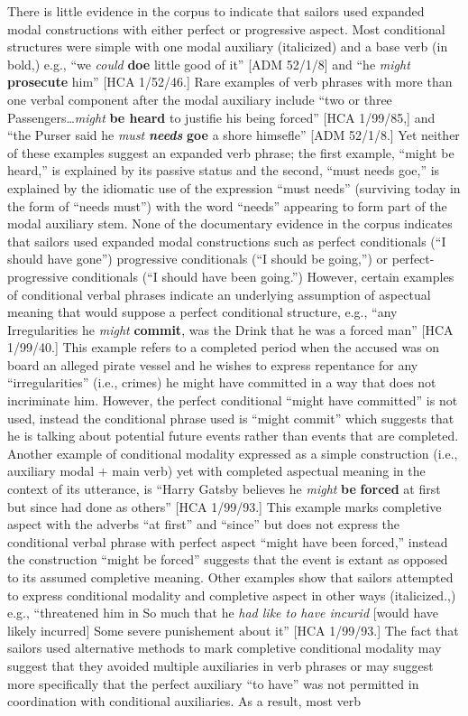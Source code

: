 \documentclass[12pt]{article}
\newenvironment{styleStandard}{\renewcommand\baselinestretch{1.0}\setlength\leftskip{0cm}\setlength\rightskip{0cm plus 1fil}\setlength\parindent{0cm}\setlength\parfillskip{0pt plus 1fil}\setlength\parskip{0in plus 1pt}\writerlistparindent\writerlistleftskip\leavevmode\normalfont\normalsize\writerlistlabel\ignorespaces}{\unskip\vspace{0in plus 1pt}\par}
\newcommand\writerlistleftskip{}
\newcommand\writerlistparindent{}
\newcommand\writerlistlabel{}
\begin{document}
\begin{styleStandard}
There is little evidence in the corpus to indicate that sailors used expanded modal constructions with either perfect or progressive aspect. Most conditional structures were simple with one modal auxiliary (italicized) and a base verb (in bold,) e.g., “we \textit{could} \textbf{doe }little good of it” [ADM 52/1/8] and “he \textit{might} \textbf{prosecute} him” [HCA 1/52/46.] Rare examples of verb phrases with more than one verbal component after the modal auxiliary include “two or three Passengers…\textit{might} \textbf{be heard} to justifie his being forced” [HCA 1/99/85,] and “the Purser said he \textit{must} \textbf{\textit{needs}}\textbf{ goe} a shore himsefle” [ADM 52/1/8.] Yet neither of these examples suggest an expanded verb phrase; the first example, “might be heard,” is explained by its passive status and the second, “must needs goe,” is explained by the idiomatic use of the expression “must needs” (surviving today in the form of “needs must”) with the word “needs” appearing to form part of the modal auxiliary stem. None of the documentary evidence in the corpus indicates that sailors used expanded modal constructions such as perfect conditionals (“I should have gone”) progressive conditionals (“I should be going,”) or perfect-progressive conditionals (“I should have been going.”) However, certain examples of conditional verbal phrases indicate an underlying assumption of aspectual meaning that would suppose a perfect conditional structure, e.g., “any Irregularities he \textit{might} \textbf{commit}, was the Drink that he was a forced man” [HCA 1/99/40.] This example refers to a completed period when the accused was on board an alleged pirate vessel and he wishes to express repentance for any “irregularities” (i.e., crimes) he might have committed in a way that does not incriminate him. However, the perfect conditional “might have committed” is not used, instead the conditional phrase used is “might commit” which suggests that he is talking about potential future events rather than events that are completed. Another example of conditional modality expressed as a simple construction (i.e., auxiliary modal + main verb) yet with completed aspectual meaning in the context of its utterance, is “Harry Gatsby believes he \textit{might }\textbf{be} \textbf{forced} at first but since had done as others” [HCA 1/99/93.] This example marks completive aspect with the adverbs “at first” and “since” but does not express the conditional verbal phrase with perfect aspect “might have been forced,” instead the construction “might be forced” suggests that the event is extant as opposed to its assumed completive meaning. Other examples show that sailors attempted to express conditional modality and completive aspect in other ways (italicized.,) e.g., “threatened him in So much that he \textit{had like to have incurid} [would have likely incurred] Some severe punishement about it” [HCA 1/99/93.] The fact that sailors used alternative methods to mark completive conditional modality may suggest that they avoided multiple auxiliaries in verb phrases or may suggest more specifically that the perfect auxiliary “to have” was not permitted in coordination with conditional auxiliaries. As a result, most verb 
\end{styleStandard}
\end{document}
